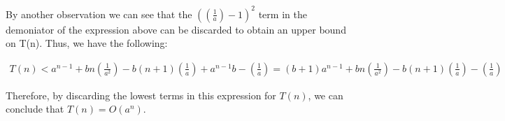\documentclass[11pt]{article}
\begin{document}
\begin{sol}
By another observation we can see that the $((\frac{1}{a}) - 1)^2$ term in the demoniator of the expression above can be discarded to obtain an upper bound on T(n). Thus, we have the following:

\begin{eqnarray*}
T(n) < a^{n-1} + bn(\frac{1}{a^2}) - b(n+1)(\frac{1}{a}) + a^{n - 1}b - (\frac{1}{a})  = (b+1)a^{n-1} + bn(\frac{1}{a^2}) - b(n+1)(\frac{1}{a}) - (\frac{1}{a}) 
\end{eqnarray*}

Therefore, by discarding the lowest terms in this expression for $T(n)$, we can conclude that $T(n) = O(a^n)$.

\end{sol}
\end{document}
